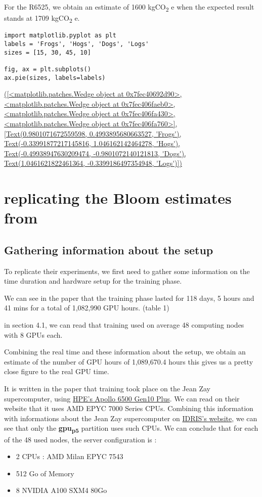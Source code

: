 \documentclass[11pt]{article}
\begin{document}
For the R6525, we obtain an estimate of 1600 kgCO\textsubscript{2} e when the expected
result stands at 1709 kgCO\textsubscript{2} e.


\begin{verbatim}
import matplotlib.pyplot as plt
labels = 'Frogs', 'Hogs', 'Dogs', 'Logs'
sizes = [15, 30, 45, 10]

fig, ax = plt.subplots()
ax.pie(sizes, labels=labels)
\end{verbatim}

\url{([<matplotlib.patches.Wedge object at 0x7fec40692d90>, <matplotlib.patches.Wedge object at 0x7fec406faeb0>, <matplotlib.patches.Wedge object at 0x7fec406fa430>, <matplotlib.patches.Wedge object at 0x7fec406fa760>], [Text(0.9801071672559598, 0.4993895680663527, 'Frogs'), Text(-0.33991877217145816, 1.046162142464278, 'Hogs'), Text(-0.49938947630209474, -0.9801072140121813, 'Dogs'), Text(1.0461621822461364, -0.3399186497354948, 'Logs')])}


\section{replicating the Bloom estimates from \cite{Luccioni2022estimating}}
\label{sec:orgf26cc06}

\subsection{Gathering information about the setup}
\label{sec:org5e7ba0e}
To replicate their experiments, we first need to gather some
information on the time duration and hardware setup for the training
phase.

We can see in the paper that the training phase lasted for 118 days, 5
hours and 41 mins for a total of 1,082,990 GPU hours. (table 1)

in section 4.1, we can read that training used on average 48 computing
nodes with 8 GPUs each.


Combining the real time and these information about the setup, we obtain an estimate of the number of GPU hours of 1,089,670.4 hours
this gives us a pretty close figure to the real GPU time.

It is written in the paper that training took place on the Jean Zay
supercomputer, using \href{https://buy.hpe.com/fr/fr/compute/apollo-systems/apollo-6500-system/apollo-6500-system/hpe-apollo-6500-gen10-plus-system/p/1013092236}{HPE's Apollo 6500 Gen10 Plus}. We can read on
their website that it uses AMD EPYC 7000 Series CPUs. Combining this
information with informations about the Jean Zay supercomputer on
\href{http://www.idris.fr/jean-zay/cpu/jean-zay-cpu-hw.html\#gpu\_p13}{IDRIS's website}, we can see that only the \textbf{\textbf{gpu\textsubscript{p5}}}  partition uses
such CPUs. 
We can conclude that for each of the 48 used nodes, the server
configuration is :
\begin{itemize}
\item 2 CPUs : AMD Milan EPYC 7543
\item 512 Go of Memory
\item 8 NVIDIA A100 SXM4 80Go
\end{itemize}
\end{document}
